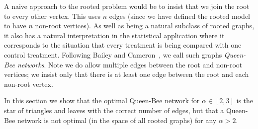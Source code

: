 \documentclass[11pt]{article}
\theoremstyle{remark}
\def\a{\alpha}
\begin{document}
A naive approach to the rooted problem would be to insist that we join
the root to every other vertex. This uses $n$ edges (since we have
defined the rooted model to have $n$ non-root vertices). As well as
being a natural subclass of rooted graphs, it also has a natural
interpretation in the statistical application where it corresponds to
the situation that every treatment is being compared with one control
treatment.  Following Bailey and Cameron~\cite{MR3026766}, we call
such graphs \emph{Queen-Bee networks}. Note we do allow multiple edges
between the root and non-root vertices; we insist only that there is
at least one edge between the root and each non-root vertex.

In this section we show that the optimal Queen-Bee network for
$\a\in[2,3]$ is the star of triangles and leaves with the correct
number of edges, but that a Queen-Bee network is not optimal (in the
space of all rooted graphs) for any $\a>2$.
\end{document}
